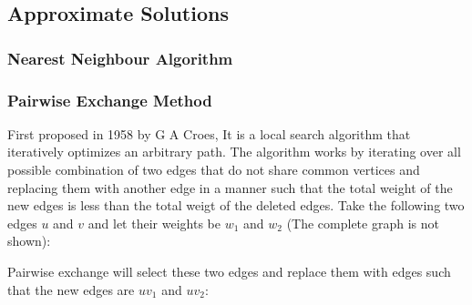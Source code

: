 \documentclass[11pt]{article}
\begin{document}
		
		
	\subsection{ Approximate Solutions}
		\subsubsection {Nearest Neighbour Algorithm}
    \subsubsection {Pairwise Exchange Method}
     First proposed in 1958 by G A Croes, It is a local search algorithm that iteratively optimizes an arbitrary path. The algorithm works by iterating over all possible combination of two edges that do not share common vertices and replacing them with another edge in a manner such that the total weight of the new edges is less than the total weigt of the deleted edges.
    Take the following two edges $u$ and $v$ and let their weights be $w_{1}$ and $w_{2}$ (The complete graph is not shown):
  \begin{center}
  \end{center}
    
    Pairwise exchange will select these two edges and replace them with edges such that the new edges are $uv_{1}$ and $uv_{2}$:
    \begin{center}
    \end{center}
    
\end{document}
